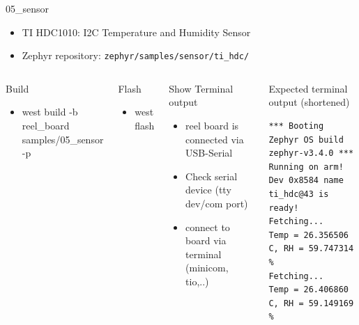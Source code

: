 \documentclass[10pt, aspectratio=169]{beamer}
\begin{document}
\begin{frame}[fragile]{05\_sensor}

  \begin{itemize}
     \item TI HDC1010: I2C Temperature and Humidity Sensor
     \item Zephyr repository: \texttt{zephyr/samples/sensor/ti\_hdc/}
  \end{itemize}

  \begin{columns}[T,onlytextwidth]
      \begin{block}{Build}
        \begin{itemize}
          \item {\scriptsize west build -b reel\_board samples/05\_sensor -p}
        \end{itemize}
      \end{block}

     \begin{block}{Flash}
        \begin{itemize}
          \item {\scriptsize west flash}
        \end{itemize}
      \end{block}

     \begin{block}{Show Terminal output}
        \begin{itemize}
           \item {\scriptsize reel board is connected via USB-Serial}
           \item {\scriptsize Check serial device (tty dev/com port)}
           \item {\scriptsize connect to board via terminal (minicom, tio,..)}
        \end{itemize}
      \end{block}


      \begin{exampleblock}{Expected terminal output (shortened)}
        {\fontsize{7}{9.6}\selectfont
          \begin{verbatim}
*** Booting Zephyr OS build zephyr-v3.4.0 ***
Running on arm!
Dev 0x8584 name ti_hdc@43 is ready!
Fetching...
Temp = 26.356506 C, RH = 59.747314 %
Fetching...
Temp = 26.406860 C, RH = 59.149169 %
          \end{verbatim}
        }
      \end{exampleblock}
  \end{columns}

\end{frame}
\end{document}
